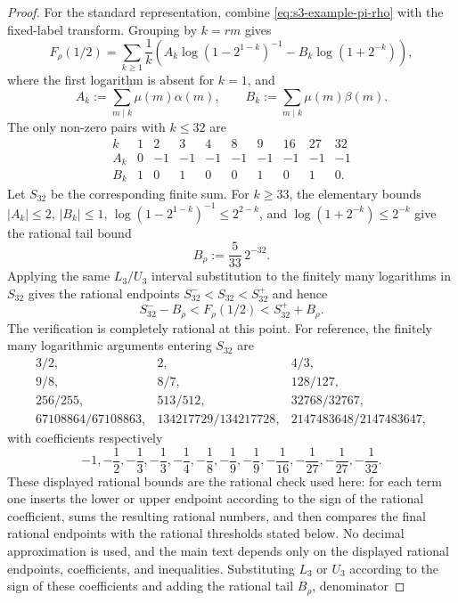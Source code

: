 \documentclass[11pt,a4paper]{amsart}
\theoremstyle{plain}
\theoremstyle{definition}
\theoremstyle{remark}
\newcommand{\abs}[1]{\lvert #1 \rvert}
\begin{document}
\begin{proof}
  For the standard representation, combine
  \eqref{eq:s3-example-pi-rho} with the fixed-label transform. Grouping by
  \(k=rm\) gives
  \[
    F_\rho(1/2)=
    \sum_{k\ge1}\frac{1}{k}
      \left(
        A_k\log(1-2^{1-k})^{-1}
        -B_k\log(1+2^{-k})
      \right),
  \]
  where the first logarithm is absent for \(k=1\), and
  \[
    A_k:=\sum_{m\mid k}\mu(m)\alpha(m),
    \qquad
    B_k:=\sum_{m\mid k}\mu(m)\beta(m).
  \]
  The only non-zero pairs with \(k\le32\) are
  \[
  \begin{array}{c|ccccccccc}
    k&1&2&3&4&8&9&16&27&32\\ \hline
    A_k&0&-1&-1&-1&-1&-1&-1&-1&-1\\
    B_k&1&0&1&0&0&1&0&1&0.
  \end{array}
  \]
  Let \(S_{32}\) be the corresponding finite sum. For \(k\ge33\), the
  elementary bounds \(\abs{A_k}\le2\), \(\abs{B_k}\le1\),
  \(\log(1-2^{1-k})^{-1}\le2^{2-k}\), and
  \(\log(1+2^{-k})\le2^{-k}\) give the rational tail bound
  \[
    B_\rho:=\frac{5}{33}\,2^{-32}.
  \]
  Applying the same \(L_3/U_3\) interval substitution to the finitely many
  logarithms in \(S_{32}\) gives the rational endpoints
  \(S_{32}^-<S_{32}<S_{32}^+\)
  and hence
  \[
    S_{32}^- -B_\rho < F_\rho(1/2)<S_{32}^+ +B_\rho.
  \]
  The verification is completely rational at this point.  For reference,
  the finitely many logarithmic arguments entering \(S_{32}\) are
  \[
  \begin{array}{ccc}
    3/2, & 2, & 4/3,\\
    9/8, & 8/7, & 128/127,\\
    256/255, & 513/512, & 32768/32767,\\
    67108864/67108863, & 134217729/134217728, &
    2147483648/2147483647,
  \end{array}
  \]
  with coefficients respectively
  \[
    -1,
    -\frac12,
    -\frac13,
    -\frac13,
    -\frac14,
    -\frac18,
    -\frac19,
    -\frac19,
    -\frac1{16},
    -\frac1{27},
    -\frac1{27},
    -\frac1{32}.
  \]
  These displayed rational bounds are the rational check used here: for
  each term one inserts the lower or upper endpoint according to the sign of
  the rational coefficient, sums the resulting rational numbers, and then
  compares the final rational endpoints with the rational thresholds stated
  below.  No decimal approximation is used, and the main text depends only on
  the displayed rational endpoints, coefficients, and inequalities.
  Substituting \(L_3\) or \(U_3\) according to the sign of these
  coefficients and adding the rational tail \(B_\rho\), denominator

\end{proof}
\end{document}

